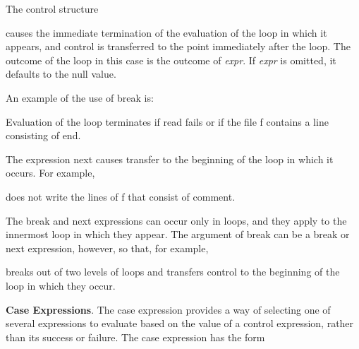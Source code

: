 The control structure



\noindent causes the immediate termination of the evaluation of the
loop in which it appears, and control is transferred to the point
immediately after the loop. The outcome of the loop in this case is
the outcome of \textit{expr}. If \textit{expr} is omitted, it defaults
to the null value.

An example of the use of break is:



Evaluation of the loop terminates if read fails or if the file f
contains a line consisting of {\textquotedbl}end{\textquotedbl}.

The expression next causes transfer to the beginning of the loop in
which it occurs. For example,


\noindent does not write the lines of f that consist of
{\textquotedbl}comment{\textquotedbl}.

The break and next expressions can occur only in loops, and they apply
to the innermost loop in which they appear. The argument of break can
be a break or next expression, however, so that, for example,



\noindent breaks out of two levels of loops and transfers control to
the beginning of the loop in which they occur.


\textbf{Case Expressions}. The case expression provides a way of
selecting one of several expressions to evaluate based on the value of
a control expression, rather than its success or failure. The case
expression has the form



